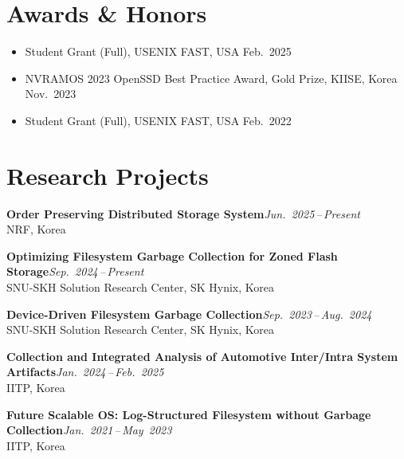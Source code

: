 \documentclass[11pt,a4paper]{article}
\newcommand{\entry}[4]{%
  \noindent\textbf{#1}\hfill\textit{#2}\\
  #3\hfill#4\par\vspace{4pt}}
\begin{document}




\section{Awards \& Honors}
\begin{itemize}[leftmargin=1.2em, nosep, itemsep=4pt]
  \item Student Grant (Full), USENIX FAST, USA \hfill Feb.\ 2025
  \item NVRAMOS 2023 OpenSSD Best Practice Award, Gold Prize, KIISE, Korea \hfill Nov.\ 2023
  \item Student Grant (Full), USENIX FAST, USA \hfill Feb.\ 2022
\end{itemize}

\section{Research Projects}

\entry{Order Preserving Distributed Storage System}
        {Jun.\ 2025\,--\,Present}
        {NRF, Korea}{}

\entry{Optimizing Filesystem Garbage Collection for Zoned Flash Storage}
      {Sep.\ 2024\,--\,Present}
      {SNU-SKH Solution Research Center, SK Hynix, Korea}{}

\entry{Device-Driven Filesystem Garbage Collection}
      {Sep.\ 2023\,--\,Aug.\ 2024}
      {SNU-SKH Solution Research Center, SK Hynix, Korea}{}

\entry{Collection and Integrated Analysis of Automotive Inter/Intra System Artifacts}
      {Jan.\ 2024\,--\,Feb.\ 2025}
      {IITP, Korea}{}

\entry{Future Scalable OS: Log-Structured Filesystem without Garbage Collection}
      {Jan.\ 2021\,--\,May\ 2023}
      {IITP, Korea}{}
\end{document}
